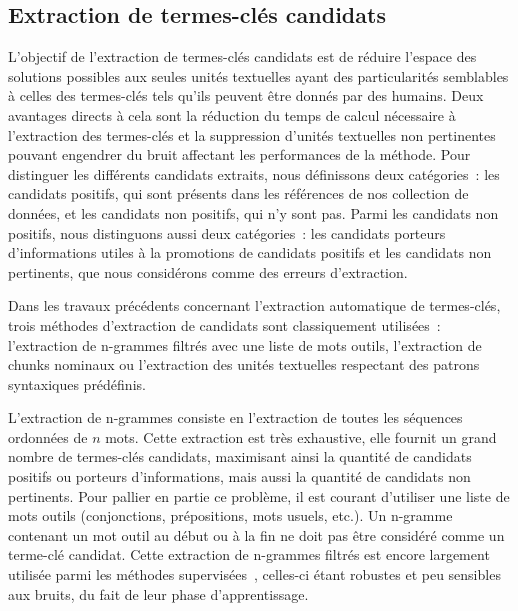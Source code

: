   \subsection{Extraction de termes-clés candidats}
  \label{subsec:extraction_de_termes_cles_candidats}
    L'objectif de l'extraction de termes-clés candidats est de réduire l'espace
    des solutions possibles aux seules unités textuelles ayant des
    particularités semblables à celles des termes-clés tels qu'ils peuvent être
    donnés par des humains. Deux avantages directs à cela sont la réduction du
    temps de calcul nécessaire à l'extraction des termes-clés et la suppression
    d'unités textuelles non pertinentes pouvant engendrer du bruit affectant
    les performances de la méthode. Pour distinguer les différents candidats
    extraits, nous définissons deux catégories~: les candidats positifs, qui
    sont présents dans les références de nos collection de données, et les
    candidats non positifs, qui n'y sont pas. Parmi les candidats non positifs,
    nous distinguons aussi deux catégories~: les candidats porteurs
    d'informations utiles à la promotions de candidats positifs et les candidats
    non pertinents, que nous considérons comme des erreurs d'extraction.

    Dans les travaux précédents concernant l'extraction automatique de
    termes-clés, trois méthodes d'extraction de candidats sont classiquement
    utilisées~: l'extraction de n-grammes filtrés avec une liste de mots outils,
    l'extraction de chunks nominaux ou l'extraction des unités textuelles
    respectant des patrons syntaxiques prédéfinis.

    L'extraction de n-grammes consiste en l'extraction de toutes les séquences
    ordonnées de $n$ mots. Cette extraction est très exhaustive, elle fournit
    un grand nombre de termes-clés candidats, maximisant ainsi la quantité de
    candidats positifs ou porteurs d'informations, mais aussi la quantité de
    candidats non pertinents. Pour pallier en partie ce problème, il est courant
    d'utiliser une liste de mots outils (conjonctions, prépositions, mots
    usuels, etc.). Un n-gramme contenant un mot outil au début ou à la fin ne
    doit pas être considéré comme un terme-clé candidat. Cette extraction de
    n-grammes filtrés est encore largement utilisée parmi les méthodes
    supervisées~\cite{witten1999kea,turney1999learningalgorithms,hulth2003keywordextraction},
    celles-ci étant robustes et peu sensibles aux bruits, du fait de leur phase
    d'apprentissage.

